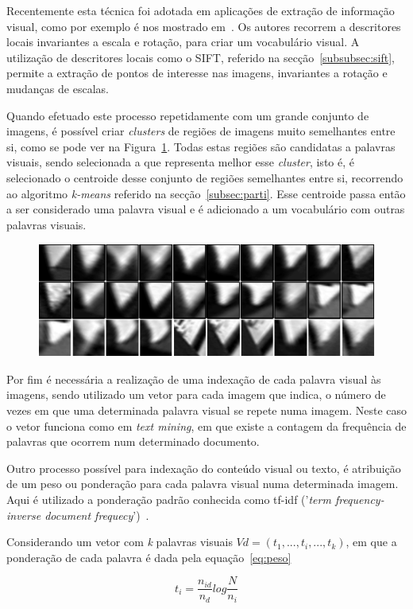 Recentemente esta técnica foi adotada em aplicações de extração de informação visual, como por exemplo é nos mostrado em~\cite{Sivic2003, Sivic2006}. Os autores recorrem a descritores locais invariantes a escala e rotação, para criar um vocabulário visual. A utilização de descritores locais como o SIFT, referido na secção~\ref{subsubsec:sift}, permite a extração de pontos de interesse nas imagens, invariantes a rotação e mudanças de escalas.

Quando efetuado este processo repetidamente com um grande conjunto de imagens, é possível criar \textit{clusters} de regiões de imagens muito semelhantes entre si, como se pode ver na Figura~\ref{fig:visualword}. Todas estas regiões são candidatas a palavras visuais, sendo selecionada a que representa melhor esse \textit{cluster}, isto é, é selecionado o centroide desse conjunto de regiões semelhantes entre si, recorrendo ao algoritmo \textit{k-means} referido na secção~\ref{subsec:parti}. Esse centroide passa então a ser considerado uma palavra visual e é adicionado a um vocabulário com outras palavras visuais.

\begin{figure}[h]
\centering
\includegraphics[width=0.4\linewidth]{./figures/visual_word_1}
\label{fig:visualword}
\end{figure}

Por fim é necessária a realização de uma indexação de cada palavra visual às imagens, sendo utilizado um vetor para cada imagem que indica, o número de vezes em que uma determinada palavra visual se repete numa imagem. Neste caso o vetor funciona como em \textit{text mining}, em que existe a contagem da frequência de palavras que ocorrem num determinado documento.

Outro processo possível para indexação do conteúdo visual ou texto, é atribuição de um peso ou ponderação para cada palavra visual numa determinada imagem. Aqui é utilizado a ponderação padrão conhecida como tf-idf ('\textit{term frequency-inverse document frequecy}')~\cite{Sivic2003}. 

Considerando um vetor com \textit{k} palavras visuais $Vd = (t_{1},...,t_{i},...,t_{k})$, em que a ponderação de cada palavra é dada pela equação~\ref{eq:peso}

\begin{equation}
t_{i} = \frac{n_{id}}{n_{d}}log\frac{N}{n_{i}}
\label{eq:peso}
\end{equation}


